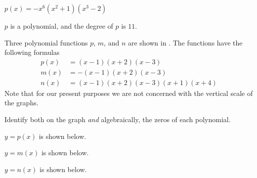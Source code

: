\begin{exercises}
\begin{problem}
\begin{multicols}{3}
\begin{subproblem}
$p(x)=-x^6(x^2+1)(x^3-2)$ 
    \begin{shortsolution}
        $p$ is a polynomial, and the degree of $p$ is $11$.
    \end{shortsolution}
\end{subproblem}
\end{multicols}
\end{problem}
\begin{problem}
Three polynomial functions $p$, $m$, and $n$ are shown in .
The functions have the following formulas
\begin{align*}
    p(x)&= (x-1)(x+2)(x-3)\\ 
    m(x)&= -(x-1)(x+2)(x-3)\\
    n(x)&= (x-1)(x+2)(x-3)(x+1)(x+4)
\end{align*}
Note that for our present purposes we are not concerned with the vertical scale of the graphs.
\begin{subproblem}
Identify both on the graph {\em and} algebraically, the zeros of each polynomial.
    \begin{shortsolution}
	$y=p(x)$ is shown below.


	$y=m(x)$ is shown below.


	$y=n(x)$ is shown below.


\end{shortsolution}
\end{subproblem}
\end{problem}
\end{exercises}
